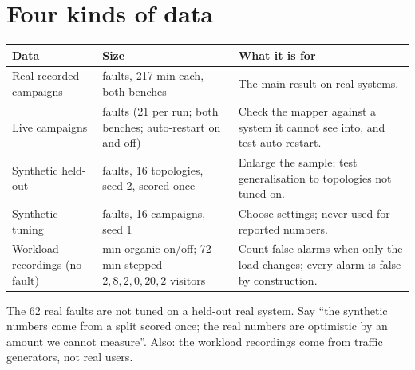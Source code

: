 \section{Four kinds of data}
\begin{center}
\small
\begin{tabularx}{\textwidth}{>{\raggedright\arraybackslash}p{2.7cm}>{\raggedright\arraybackslash}p{2.7cm}>{\raggedright\arraybackslash}X}
\toprule
\textbf{Data} & \textbf{Size} & \textbf{What it is for}\\
\midrule
Real recorded campaigns & 62 faults, 217 min each, both benches & The main result on real systems.\\
Live campaigns & 84 faults (21 per run; both benches; auto-restart on and off) & Check the mapper against a system it cannot see into, and test auto-restart.\\
Synthetic held-out & 178 faults, 16 topologies, seed 2, scored once & Enlarge the sample; test generalisation to topologies not tuned on.\\
Synthetic tuning & 170 faults, 16 campaigns, seed 1 & Choose settings; never used for reported numbers.\\
Workload recordings (no fault) & 62 min organic on/off; 72 min stepped $2,8,2,0,20,2$ visitors & Count false alarms when only the load changes; every alarm is false by construction.\\
\bottomrule
\end{tabularx}
\end{center}

\begin{warnbox}
The 62 real faults are not tuned on a held-out real system. Say ``the synthetic numbers come from a split scored once; the real numbers are optimistic by an amount we cannot measure''. Also: the workload recordings come from traffic generators, not real users.
\end{warnbox}

